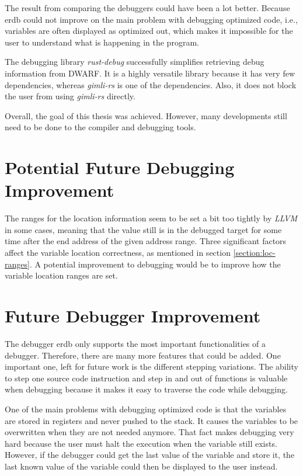 


The result from comparing the debuggers could have been a lot better.
Because \gls{erdb} could not improve on the main problem with debugging optimized code, i.e., variables are often displayed as optimized out, which makes it impossible for the user to understand what is happening in the program.


The debugging library \emph{rust-debug} successfully simplifies retrieving debug information from \gls{DWARF}.
It is a highly versatile library because it has very few dependencies, whereas \emph{gimli-rs} is one of the dependencies.
Also, it does not block the user from using \emph{gimli-rs} directly.


Overall, the goal of this thesis was achieved.
However, many developments still need to be done to the compiler and debugging tools.



\section{Potential Future Debugging Improvement}
The ranges for the location information seem to be set a bit too tightly by \emph{LLVM} in some cases, meaning that the value still is in the debugged target for some time after the end address of the given address range.
Three significant factors affect the variable location correctness, as mentioned in section \ref{section:loc-ranges}.
A potential improvement to debugging would be to improve how the variable location ranges are set.



\section{Future Debugger Improvement}
The debugger \gls{erdb} only supports the most important functionalities of a debugger.
Therefore, there are many more features that could be added.
One important one, left for future work is the different stepping variations.
The ability to step one source code instruction and step in and out of functions is valuable when debugging because it makes it easy to traverse the code while debugging.


One of the main problems with debugging optimized code is that the variables are stored in registers and never pushed to the stack.
It causes the variables to be overwritten when they are not needed anymore.
That fact makes debugging very hard because the user must halt the execution when the variable still exists.
However, if the debugger could get the last value of the variable and store it, the last known value of the variable could then be displayed to the user instead.
